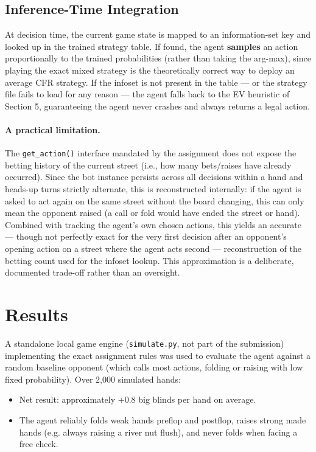 \documentclass[11pt]{article}
\begin{document}
\subsection{Inference-Time Integration}

At decision time, the current game state is mapped to an information-set key
and looked up in the trained strategy table. If found, the agent
\textbf{samples} an action proportionally to the trained probabilities
(rather than taking the arg-max), since playing the exact mixed strategy is
the theoretically correct way to deploy an average CFR strategy. If the
infoset is not present in the table --- or the strategy file fails to load
for any reason --- the agent falls back to the EV heuristic of Section 5,
guaranteeing the agent never crashes and always returns a legal action.

\paragraph{A practical limitation.} The \texttt{get\_action()} interface
mandated by the assignment does not expose the betting history of the
current street (i.e., how many bets/raises have already occurred). Since the
bot instance persists across all decisions within a hand and heads-up turns
strictly alternate, this is reconstructed internally: if the agent is asked
to act again on the same street without the board changing, this can only
mean the opponent raised (a call or fold would have ended the street or
hand). Combined with tracking the agent's own chosen actions, this yields an
accurate --- though not perfectly exact for the very first decision after an
opponent's opening action on a street where the agent acts second ---
reconstruction of the betting count used for the infoset lookup. This
approximation is a deliberate, documented trade-off rather than an oversight.

\section{Results}

A standalone local game engine (\texttt{simulate.py}, not part of the
submission) implementing the exact assignment rules was used to evaluate the
agent against a random baseline opponent (which calls most actions, folding
or raising with low fixed probability). Over 2{,}000 simulated hands:

\begin{itemize}
    \item Net result: approximately $+0.8$ big blinds per hand on average.
    \item The agent reliably folds weak hands preflop and postflop, raises
    strong made hands (e.g. always raising a river nut flush), and never
    folds when facing a free check.
\end{itemize}
\end{document}
